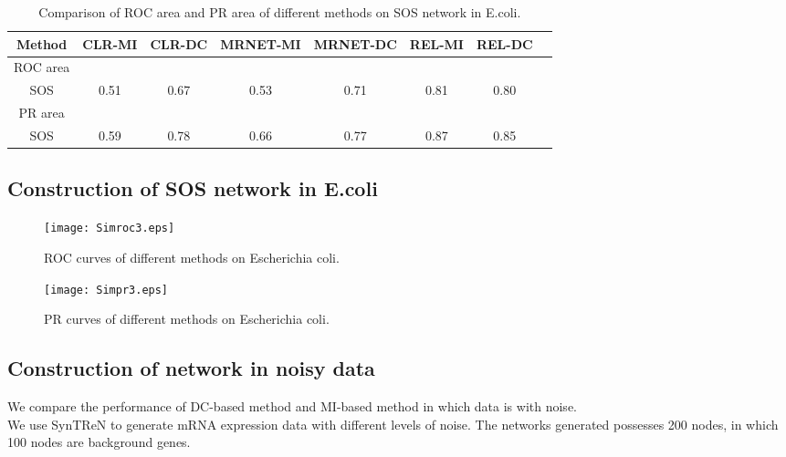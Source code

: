 \documentclass{bioinfo}
\begin{document}
\begin{table}[0.5\textwidth] \tiny
\centering \caption{Comparison of ROC area and PR area of different methods on SOS network in E.coli.}\label{roc-pr}
\begin{tabular}{cccccccc}
 \hline
 Method & CLR-MI & CLR-DC & MRNET-MI & MRNET-DC & REL-MI & REL-DC \\
 \hline
  ROC area\\
  SOS     & 0.51 & 0.67 & 0.53 & 0.71 & 0.81 & 0.80 \\
 PR area\\
  SOS   & 0.59 &0.78 & 0.66 & 0.77 & 0.87 & 0.85 \\
  \hline
\end{tabular}
\end{table}

\subsection{Construction of SOS network in E.coli}
\begin{figure}[!h]
  \texttt{[image: Simroc3.eps]}
  \caption{ROC curves of different methods on Escherichia coli.}\label{roc-sos}
\end{figure}

\begin{figure}[!h]
  \texttt{[image: Simpr3.eps]}
  \caption{PR curves of different methods on Escherichia coli.}\label{pr-sos}
\end{figure}

\subsection{Construction of network in noisy data}
We compare the performance of DC-based method and MI-based method in
which data is with noise.\\
We use SynTReN to generate mRNA expression data with different
levels of noise. The networks generated possesses 200 nodes, in
which 100 nodes are background genes.\\
\end{document}
